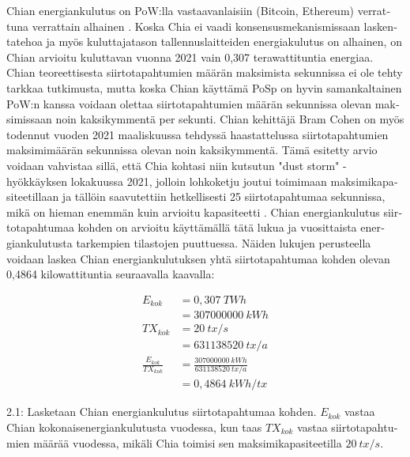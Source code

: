 \begin{otherlanguage}{english}
Chian energiankulutus on PoW:lla vastaavanlaisiin (Bitcoin, Ethereum) verrattuna verrattain alhainen \cite{chiaenergy}. Koska Chia ei vaadi konsensusmekanismissaan laskentatehoa ja myös kuluttajatason tallennuslaitteiden energiakulutus on alhainen, on Chian arvioitu kuluttavan vuonna 2021 vain 0,307 terawattituntia energiaa. Chian teoreettisesta siirtotapahtumien määrän maksimista sekunnissa ei ole tehty tarkkaa tutkimusta, mutta koska Chian käyttämä PoSp on hyvin samankaltainen PoW:n kanssa voidaan olettaa siirtotapahtumien määrän sekunnissa olevan maksimissaan noin kaksikymmentä per sekunti. Chian kehittäjä Bram Cohen on myös todennut vuoden 2021 maaliskuussa tehdyssä haastattelussa \cite{bram-cohen-interview} siirtotapahtumien maksimimäärän sekunnissa olevan noin kaksikymmentä. Tämä esitetty arvio voidaan vahvistaa sillä, että Chia kohtasi niin kutsutun "dust storm" -hyökkäyksen lokakuussa 2021, jolloin lohkoketju joutui toimimaan maksimikapasiteetillaan ja tällöin saavutettiin hetkellisesti 25 siirtotapahtumaa sekunnissa, mikä on hieman enemmän kuin arvioitu kapasiteetti \cite{chia-tps}. Chian energiankulutus siirtotapahtumaa kohden on arvioitu käyttämällä tätä lukua ja vuosittaista energiankulutusta tarkempien tilastojen puuttuessa. Näiden lukujen perusteella voidaan laskea Chian energiankulutuksen yhtä siirtotapahtumaa kohden olevan 0,4864 kilowattituntia seuraavalla kaavalla:
\begin{mycapequ}[!htbp]
\begin{equation}
\begin{split}
E_{kok} & = 0,307~TWh \\
 & = 307000000~kWh \\
TX_{kok} & = 20~tx/s \\ 
 & = 631138520~tx/a \\
\frac{E_{kok}}{TX_{kok}} & = \frac{307000000~kWh}{631138520~tx/a} \\
 & = 0,4864~kWh/tx
\end{split}
\end{equation}
\caption{2.1: Lasketaan Chian energiankulutus siirtotapahtumaa kohden. \(E_{kok}\) vastaa Chian kokonaisenergiankulutusta vuodessa, kun taas \(TX_{kok}\) vastaa siirtotapahtumien määrää vuodessa, mikäli Chia toimisi sen maksimikapasiteetilla \(20~tx/s\).}
\end{mycapequ}


\end{otherlanguage}
